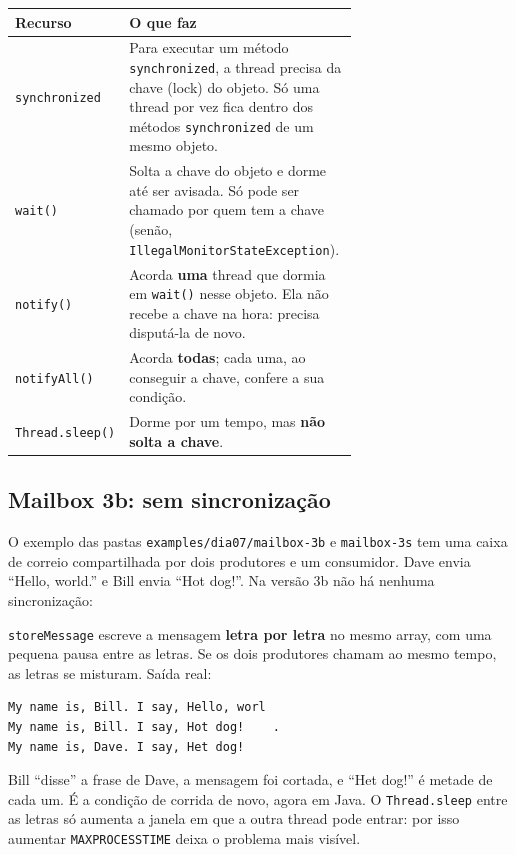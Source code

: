 \documentclass[11pt,a4paper]{article}
\newcommand{\raiz}{../../../..}
\newcommand{\cmd}[1]{\texttt{#1}}
\begin{document}
\begin{center}
\begin{tabular}{@{}lR{0.68\linewidth}@{}}
\toprule
\textbf{Recurso} & \textbf{O que faz} \\
\midrule
\cmd{synchronized} & Para executar um método \cmd{synchronized}, a thread precisa da chave (lock) do objeto. Só uma thread por vez fica dentro dos métodos \cmd{synchronized} de um mesmo objeto. \\
\cmd{wait()} & Solta a chave do objeto e dorme até ser avisada. Só pode ser chamado por quem tem a chave (senão, \cmd{IllegalMonitorStateException}). \\
\cmd{notify()} & Acorda \textbf{uma} thread que dormia em \cmd{wait()} nesse objeto. Ela não recebe a chave na hora: precisa disputá-la de novo. \\
\cmd{notifyAll()} & Acorda \textbf{todas}; cada uma, ao conseguir a chave, confere a sua condição. \\
\cmd{Thread.sleep()} & Dorme por um tempo, mas \textbf{não solta a chave}. \\
\bottomrule
\end{tabular}
\end{center}

\subsection{Mailbox 3b: sem sincronização}

O exemplo das pastas \cmd{examples/dia07/mailbox-3b} e \cmd{mailbox-3s} tem uma caixa de correio compartilhada por dois produtores e um consumidor. Dave envia ``Hello, world.'' e Bill envia ``Hot dog!''. Na versão 3b não há nenhuma sincronização:



\cmd{storeMessage} escreve a mensagem \textbf{letra por letra} no mesmo array, com uma pequena pausa entre as letras. Se os dois produtores chamam ao mesmo tempo, as letras se misturam. Saída real:

\begin{lstlisting}[style=terminal]
My name is, Bill. I say, Hello, worl
My name is, Bill. I say, Hot dog!    .
My name is, Dave. I say, Het dog!
\end{lstlisting}

Bill ``disse'' a frase de Dave, a mensagem foi cortada, e ``Het dog!'' é metade de cada um. É a condição de corrida de novo, agora em Java. O \cmd{Thread.sleep} entre as letras só aumenta a janela em que a outra thread pode entrar: por isso aumentar \cmd{MAXPROCESSTIME} deixa o problema mais visível.
\end{document}
